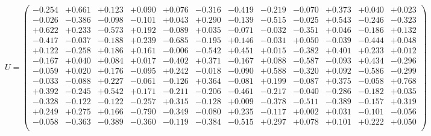 \documentclass[9pt]{article}
\theoremstyle{plain}
\theoremstyle{definition}
\theoremstyle{remark}
\numberwithin{equation}{section}
\begin{document}
$U = \left(
\begin{array}{
cccccccccccc}
-0.254 & +0.661 & +0.123 & +0.090 & +0.076 & -0.316 & -0.419 & -0.219 & -0.070 & +0.373 & +0.040 & +0.023 \\
-0.026 & -0.386 & -0.098 & -0.101 & +0.043 & +0.290 & -0.139 & -0.515 & -0.025 & +0.543 & -0.246 & -0.323 \\
+0.622 & +0.233 & -0.573 & +0.192 & -0.089 & +0.035 & -0.071 & -0.032 & -0.351 & +0.046 & -0.186 & +0.132 \\
-0.417 & -0.037 & -0.188 & +0.239 & -0.685 & -0.195 & +0.146 & -0.031 & +0.050 & -0.039 & -0.444 & +0.048 \\
+0.122 & -0.258 & +0.186 & +0.161 & -0.006 & -0.542 & +0.451 & +0.015 & -0.382 & +0.401 & +0.233 & +0.012 \\
-0.167 & +0.040 & +0.084 & +0.017 & -0.402 & +0.371 & -0.167 & +0.088 & -0.587 & -0.093 & +0.434 & -0.296 \\
-0.059 & +0.020 & +0.176 & -0.095 & +0.242 & -0.018 & -0.090 & +0.588 & -0.320 & +0.092 & -0.586 & -0.299 \\
-0.033 & -0.088 & +0.227 & -0.061 & -0.126 & +0.364 & -0.081 & +0.199 & -0.087 & +0.375 & -0.058 & +0.768 \\
+0.392 & -0.245 & +0.542 & +0.171 & -0.211 & -0.206 & -0.461 & -0.217 & -0.040 & -0.286 & -0.182 & +0.035 \\
-0.328 & -0.122 & -0.122 & -0.257 & +0.315 & -0.128 & +0.009 & -0.378 & -0.511 & -0.389 & -0.157 & +0.319 \\
+0.249 & +0.275 & +0.166 & -0.790 & -0.349 & -0.080 & +0.235 & -0.117 & +0.002 & +0.031 & -0.101 & -0.056 \\
-0.058 & -0.363 & -0.389 & -0.360 & -0.119 & -0.384 & -0.515 & +0.297 & +0.078 & +0.101 & +0.222 & +0.050 \\
\end{array}
\right)$ \newline 
\end{document}
